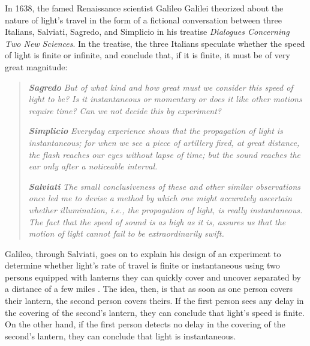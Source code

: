 \documentclass[twocolumn]{article}
\begin{document}
		In 1638, the famed Renaissance scientist Galileo Galilei theorized about the nature of light's travel in the form of a fictional conversation between three Italians, Salviati, Sagredo, and Simplicio in his treatise \textit{Dialogues Concerning Two New Sciences}.\cite{galilei_dialogues_1638}
		In the treatise, the three Italians speculate whether the speed of light is finite or infinite, and conclude that, if it is finite, it must be of very great magnitude:
		
		\begin{quotation}
			\noindent
			\textit{\textbf{Sagredo}} \newline 
			\textit{But of what kind and how great must we consider this speed of light to be? 
			Is it instantaneous or momentary or does it like other motions require time? 
			Can we not decide this by experiment?}
			
			\noindent \newline
			\textit{\textbf{Simplicio}} \newline 
			\textit{Everyday experience shows that the propagation of light is instantaneous; for when we see a piece of artillery fired, at great distance, the flash reaches our eyes without lapse of time; but the sound reaches the ear only after a noticeable interval.}
			
			
			\noindent \newline
			\textit{\textbf{Salviati}} \newline
			\textit{The small conclusiveness of these and other similar observations once led me to
			devise a method by which one might accurately ascertain whether illumination, i.e., the propagation of light, is really instantaneous. The fact that the speed of sound is as high as it is, assures us that the motion of light cannot fail to be extraordinarily swift.}
		\end{quotation}
		
		Galileo, through Salviati, goes on to explain his design of an experiment to determine whether light's rate of travel is finite or instantaneous using two persons equipped with lanterns they can quickly cover and uncover separated by a distance of a few miles . 
		The idea, then, is that as soon as one person covers their lantern, the second person covers theirs. 
		If the first person sees any delay in the covering of the second's lantern, they can conclude that light's speed is finite. 
		On the other hand, if the first person detects no delay in the covering of the second's lantern, they can conclude that light is instantaneous.
		
\end{document}
